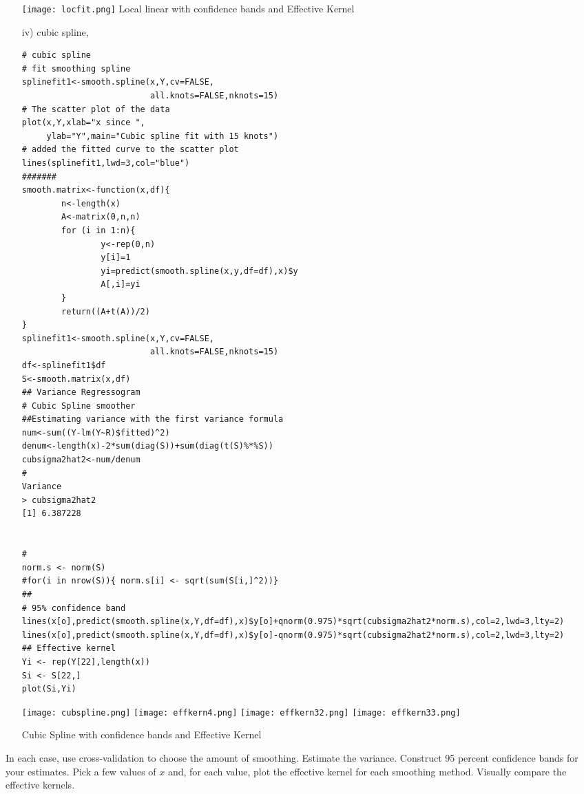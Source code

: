 \documentclass[11pt]{report}
\begin{document}
\begin{itemize}
\texttt{[image: locfit.png]}
Local linear with confidence bands   and Effective Kernel


\item[iv) ] cubic spline,
\begin{verbatim}
# cubic spline 
# fit smoothing spline
splinefit1<-smooth.spline(x,Y,cv=FALSE,
                          all.knots=FALSE,nknots=15)
# The scatter plot of the data
plot(x,Y,xlab="x since ",
     ylab="Y",main="Cubic spline fit with 15 knots")
# added the fitted curve to the scatter plot
lines(splinefit1,lwd=3,col="blue")
#######
smooth.matrix<-function(x,df){
        n<-length(x)
        A<-matrix(0,n,n)
        for (i in 1:n){
                y<-rep(0,n)
                y[i]=1
                yi=predict(smooth.spline(x,y,df=df),x)$y
                A[,i]=yi
        }
        return((A+t(A))/2)
}
splinefit1<-smooth.spline(x,Y,cv=FALSE,
                          all.knots=FALSE,nknots=15)
df<-splinefit1$df
S<-smooth.matrix(x,df)
## Variance Regressogram
# Cubic Spline smoother
##Estimating variance with the first variance formula
num<-sum((Y-lm(Y~R)$fitted)^2)
denum<-length(x)-2*sum(diag(S))+sum(diag(t(S)%*%S))
cubsigma2hat2<-num/denum
# 
Variance
> cubsigma2hat2
[1] 6.387228


#
norm.s <- norm(S)
#for(i in nrow(S)){ norm.s[i] <- sqrt(sum(S[i,]^2))}
##
# 95% confidence band
lines(x[o],predict(smooth.spline(x,Y,df=df),x)$y[o]+qnorm(0.975)*sqrt(cubsigma2hat2*norm.s),col=2,lwd=3,lty=2)
lines(x[o],predict(smooth.spline(x,Y,df=df),x)$y[o]-qnorm(0.975)*sqrt(cubsigma2hat2*norm.s),col=2,lwd=3,lty=2)
## Effective kernel
Yi <- rep(Y[22],length(x))
Si <- S[22,]
plot(Si,Yi)
\end{verbatim}

\texttt{[image: cubspline.png]}
\texttt{[image: effkern4.png]}
\texttt{[image: effkern32.png]}
\texttt{[image: effkern33.png]}

Cubic Spline with confidence bands and Effective Kernel


\end{itemize}
In each case, use cross-validation to choose the amount of smoothing. Estimate the variance. Construct 95 percent confidence bands for your estimates. Pick a few values of $x$ and, for each value, plot the effective kernel for each smoothing method. Visually compare the effective kernels. \\



\end{document}
